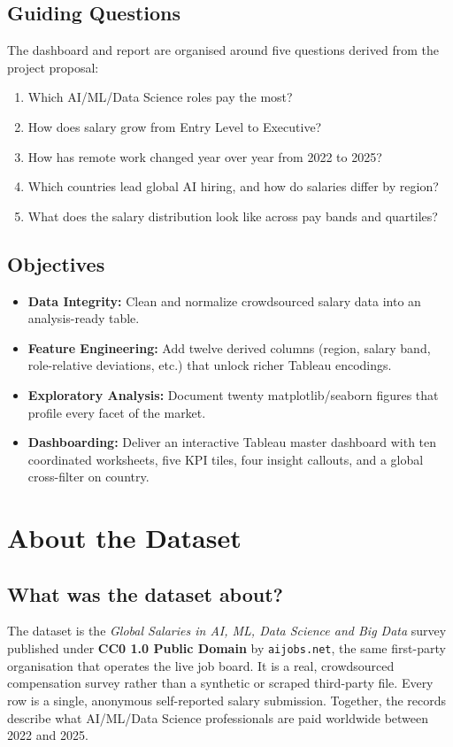 \documentclass[11pt,a4paper,oneside]{report}
\begin{document}
\section{Guiding Questions}
The dashboard and report are organised around five questions derived from the project proposal:
\begin{enumerate}
    \item Which AI/ML/Data Science roles pay the most?
    \item How does salary grow from Entry Level to Executive?
    \item How has remote work changed year over year from 2022 to 2025?
    \item Which countries lead global AI hiring, and how do salaries differ by region?
    \item What does the salary distribution look like across pay bands and quartiles?
\end{enumerate}

\section{Objectives}
\begin{itemize}
    \item \textbf{Data Integrity:} Clean and normalize crowdsourced salary data into an analysis-ready table.
    \item \textbf{Feature Engineering:} Add twelve derived columns (region, salary band, role-relative deviations, etc.) that unlock richer Tableau encodings.
    \item \textbf{Exploratory Analysis:} Document twenty matplotlib/seaborn figures that profile every facet of the market.
    \item \textbf{Dashboarding:} Deliver an interactive Tableau master dashboard with ten coordinated worksheets, five KPI tiles, four insight callouts, and a global cross-filter on country.
\end{itemize}

\chapter{About the Dataset}
\label{ch:dataset}

\section{What was the dataset about?}
\label{sec:what_dataset}
The dataset is the \textit{Global Salaries in AI, ML, Data Science and Big Data} survey published under \textbf{CC0 1.0 Public Domain} by \texttt{aijobs.net}, the same first-party organisation that operates the live job board. It is a real, crowdsourced compensation survey rather than a synthetic or scraped third-party file. Every row is a single, anonymous self-reported salary submission. Together, the records describe what AI/ML/Data Science professionals are paid worldwide between 2022 and 2025.
\end{document}
